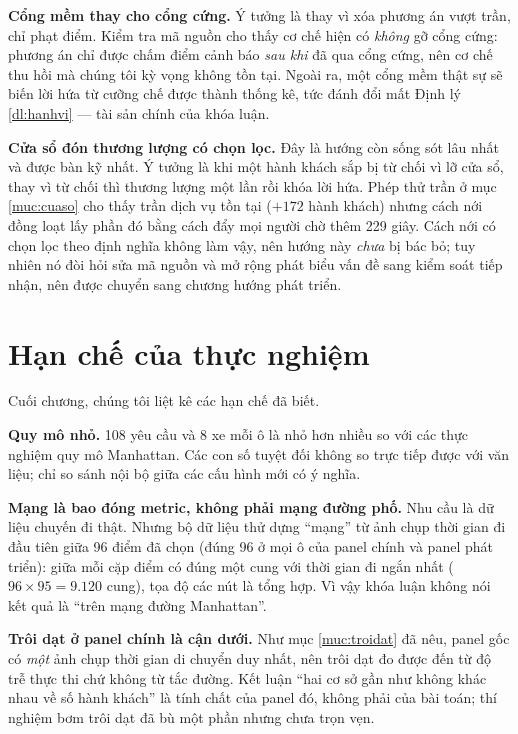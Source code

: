 \textbf{Cổng mềm thay cho cổng cứng.} Ý tưởng là thay vì xóa phương án vượt trần, chỉ phạt điểm.
Kiểm tra mã nguồn cho thấy cơ chế hiện có \emph{không} gỡ cổng cứng: phương án chỉ được chấm
điểm cảnh báo \emph{sau khi} đã qua cổng cứng, nên cơ chế thu hồi mà chúng tôi kỳ vọng không tồn
tại. Ngoài ra, một cổng mềm thật sự sẽ biến lời hứa từ cưỡng chế được thành thống kê, tức đánh
đổi mất Định lý \ref{dl:hanhvi} --- tài sản chính của khóa luận.

\textbf{Cửa sổ đón thương lượng có chọn lọc.} Đây là hướng còn sống sót lâu nhất và được bàn kỹ
nhất. Ý tưởng là khi một hành khách sắp bị từ chối vì lỡ cửa sổ, thay vì từ chối thì thương
lượng một lần rồi khóa lời hứa. Phép thử trần ở mục \ref{muc:cuaso} cho thấy trần dịch vụ tồn tại
($+172$ hành khách) nhưng cách nới đồng loạt lấy phần đó bằng cách đẩy mọi người chờ thêm 229
giây. Cách nới có chọn lọc theo định nghĩa không làm vậy, nên hướng này \emph{chưa} bị bác bỏ;
tuy nhiên nó đòi hỏi sửa mã nguồn và mở rộng phát biểu vấn đề sang kiểm soát tiếp nhận, nên
được chuyển sang chương hướng phát triển.

\section{Hạn chế của thực nghiệm}
\label{muc:hanche}

Cuối chương, chúng tôi liệt kê các hạn chế đã biết.

\textbf{Quy mô nhỏ.} 108 yêu cầu và 8 xe mỗi ô là nhỏ hơn nhiều so với các thực nghiệm quy mô
Manhattan. Các con số tuyệt đối không so trực tiếp được với văn liệu; chỉ so sánh nội bộ giữa
các cấu hình mới có ý nghĩa.

\textbf{Mạng là bao đóng metric, không phải mạng đường phố.} Nhu cầu là dữ liệu chuyến đi thật.
Nhưng bộ dữ liệu thử dựng ``mạng'' từ ảnh chụp thời gian đi đầu tiên giữa 96 điểm đã chọn (đúng
96 ở mọi ô của panel chính và panel phát triển): giữa mỗi cặp điểm có đúng một cung với thời gian đi ngắn nhất ($96 \times 95 = 9.120$ cung),
tọa độ các nút là tổng hợp. Vì vậy khóa luận không nói kết quả là ``trên mạng đường Manhattan''.

\textbf{Trôi dạt ở panel chính là cận dưới.} Như mục \ref{muc:troidat} đã nêu, panel gốc có
\emph{một} ảnh chụp thời gian di chuyển duy nhất, nên trôi dạt đo được đến từ độ trễ thực thi
chứ không từ tắc đường. Kết luận ``hai cơ sở gần như không khác nhau về số hành khách'' là tính
chất của panel đó, không phải của bài toán; thí nghiệm bơm trôi dạt đã bù một phần nhưng chưa trọn
vẹn.

